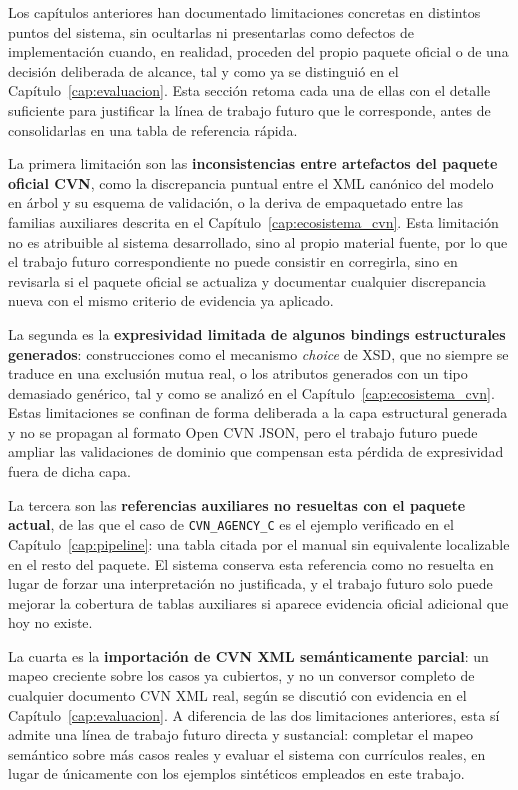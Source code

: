 Los capítulos anteriores han documentado limitaciones concretas en distintos
puntos del sistema, sin ocultarlas ni presentarlas como defectos de
implementación cuando, en realidad, proceden del propio paquete oficial o de
una decisión deliberada de alcance, tal y como ya se distinguió en el
Capítulo~\ref{cap:evaluacion}. Esta sección retoma cada una de ellas con el
detalle suficiente para justificar la línea de trabajo futuro que le
corresponde, antes de consolidarlas en una tabla de referencia rápida.

La primera limitación son las \textbf{inconsistencias entre artefactos del
paquete oficial CVN}, como la discrepancia puntual entre el XML canónico del
modelo en árbol y su esquema de validación, o la deriva de empaquetado entre
las familias auxiliares descrita en el Capítulo~\ref{cap:ecosistema_cvn}.
Esta limitación no es atribuible al sistema desarrollado, sino al propio
material fuente, por lo que el trabajo futuro correspondiente no puede
consistir en corregirla, sino en revisarla si el paquete oficial se
actualiza y documentar cualquier discrepancia nueva con el mismo criterio de
evidencia ya aplicado.

La segunda es la \textbf{expresividad limitada de algunos bindings
estructurales generados}: construcciones como el mecanismo \textit{choice}
de XSD, que no siempre se traduce en una exclusión mutua real, o los
atributos generados con un tipo demasiado genérico, tal y como se analizó en
el Capítulo~\ref{cap:ecosistema_cvn}. Estas limitaciones se confinan de
forma deliberada a la capa estructural generada y no se propagan al formato
Open CVN JSON, pero el trabajo futuro puede ampliar las validaciones de
dominio que compensan esta pérdida de expresividad fuera de dicha capa.

La tercera son las \textbf{referencias auxiliares no resueltas con el
paquete actual}, de las que el caso de \texttt{CVN\_AGENCY\_C} es el
ejemplo verificado en el Capítulo~\ref{cap:pipeline}: una tabla citada por
el manual sin equivalente localizable en el resto del paquete. El sistema
conserva esta referencia como no resuelta en lugar de forzar una
interpretación no justificada, y el trabajo futuro solo puede mejorar la
cobertura de tablas auxiliares si aparece evidencia oficial adicional que
hoy no existe.

La cuarta es la \textbf{importación de CVN XML semánticamente parcial}: un
mapeo creciente sobre los casos ya cubiertos, y no un conversor completo de
cualquier documento CVN XML real, según se discutió con evidencia en el
Capítulo~\ref{cap:evaluacion}. A diferencia de las dos limitaciones
anteriores, esta sí admite una línea de trabajo futuro directa y
sustancial: completar el mapeo semántico sobre más casos reales y evaluar
el sistema con currículos reales, en lugar de únicamente con los ejemplos
sintéticos empleados en este trabajo.

